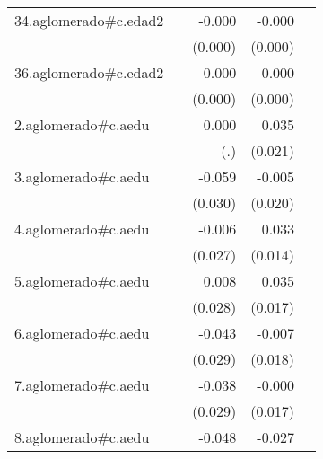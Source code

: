 {\begin{longtable}{l*{4}{D{.}{.}{-1}}}
\addlinespace
34.aglomerado#c.edad2&                     &      -0.000         &      -0.000\sym{***}&                     \\
            &                     &     (0.000)         &     (0.000)         &                     \\
\addlinespace
36.aglomerado#c.edad2&                     &       0.000         &      -0.000         &                     \\
            &                     &     (0.000)         &     (0.000)         &                     \\
\addlinespace
2.aglomerado#c.aedu&                     &       0.000         &       0.035         &                     \\
            &                     &         (.)         &     (0.021)         &                     \\
\addlinespace
3.aglomerado#c.aedu&                     &      -0.059\sym{*}  &      -0.005         &                     \\
            &                     &     (0.030)         &     (0.020)         &                     \\
\addlinespace
4.aglomerado#c.aedu&                     &      -0.006         &       0.033\sym{*}  &                     \\
            &                     &     (0.027)         &     (0.014)         &                     \\
\addlinespace
5.aglomerado#c.aedu&                     &       0.008         &       0.035\sym{*}  &                     \\
            &                     &     (0.028)         &     (0.017)         &                     \\
\addlinespace
6.aglomerado#c.aedu&                     &      -0.043         &      -0.007         &                     \\
            &                     &     (0.029)         &     (0.018)         &                     \\
\addlinespace
7.aglomerado#c.aedu&                     &      -0.038         &      -0.000         &                     \\
            &                     &     (0.029)         &     (0.017)         &                     \\
\addlinespace
8.aglomerado#c.aedu&                     &      -0.048         &      -0.027         &                     \\

\end{longtable}}
